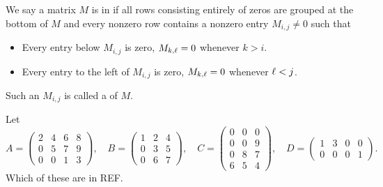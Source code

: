 \documentclass{ximera}
\begin{document}
\begin{definition}
  We say a matrix $M$ is in  if all rows
  consisting entirely of zeros are grouped at the bottom of $M$ and
  every nonzero row contains a nonzero entry $M_{i,j}\ne 0$ such that
  \begin{itemize}
  \item Every entry below $M_{i,j}$ is zero, $M_{k,\ell}=0$ whenever $k> i$.
  \item Every entry to the left of $M_{i,j}$ is zero, $M_{k,\ell}=0$ whenever $\ell < j$.
  \end{itemize}
  Such an $M_{i,j}$ is called a  of $M$.
\end{definition}

\begin{question}
  Let
  \[
    A =
    \begin{pmatrix}
      2 & 4 & 6 & 8 \\
      0 & 5 & 7 & 9 \\
      0 & 0 & 1 & 3
    \end{pmatrix}, \quad
    B =
    \begin{pmatrix}
      1 & 2 & 4 \\
      0 & 3 & 5 \\
      0 & 6 & 7
    \end{pmatrix}, \quad
    C =
    \begin{pmatrix}
      0 & 0 & 0 \\
      0 & 0 & 9 \\
      0 & 8 & 7 \\
      6 & 5 & 4
    \end{pmatrix}, \quad
    D =
    \begin{pmatrix}
      1 & 3 & 0 & 0 \\
      0 & 0 & 0 & 1
    \end{pmatrix}.
  \]
  Which of these are in REF.
  \begin{selectAll}
  \end{selectAll}
\end{question}
\end{document}
